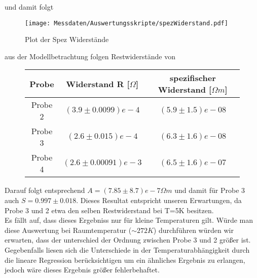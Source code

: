     und damit folgt
    \begin{figure}[H]
        \centering
        \texttt{[image: Messdaten/Auswertungsskripte/spezWiderstand.pdf]}
        \caption{Plot der Spez Widerstände}
        \label{spec resistance plot}
    \end{figure}
    aus der Modellbetrachtung folgen Restwiderstände von
    \begin{figure}[H]
        \centering
        \begin{tabular}{c|c|c}
            Probe & Widerstand R [$\Omega$] &spezifischer Widerstand [$\Omega m$] \\
            \hline
            Probe 2 & $(3.9\pm 0.0099)e-4 $ & $(5.9\pm 1.5)e-08$ \\
            Probe 3 & $(2.6\pm 0.015)e-4 $ & $(6.3\pm 1.6)e-08$ \\
            Probe 4 & $(2.6\pm 0.00091)e-3 $ & $(6.5\pm 1.6)e-07$ \\
        \end{tabular}
    \end{figure}
    Darauf folgt entsprechend $A=(7.85\pm8.7)e-7 \Omega m$ und damit für Probe 3 auch $S=0.997 \pm 0.018$. Dieses Resultat
    entspricht unseren Erwartungen, da Probe 3 und 2 etwa den selben Restwiderstand bei T=5K besitzen.\\
    Es fällt auf, dass dieses Ergebniss nur für kleine Temperaturen gilt. Würde man diese Auswertung bei
    Raumtemperatur ($\sim 272K$) durchführen würden wir erwarten, dass der unterschied der Ordnung zwischen Probe
    3 und 2 größer ist. Gegebenfalls liesen sich die Unterschiede in der Temperaturabhängigkeit durch die lineare
    Regression berücksichtigen um ein ähnliches Ergebnis zu erlangen, jedoch wäre dieses Ergebnis größer fehlerbehaftet.